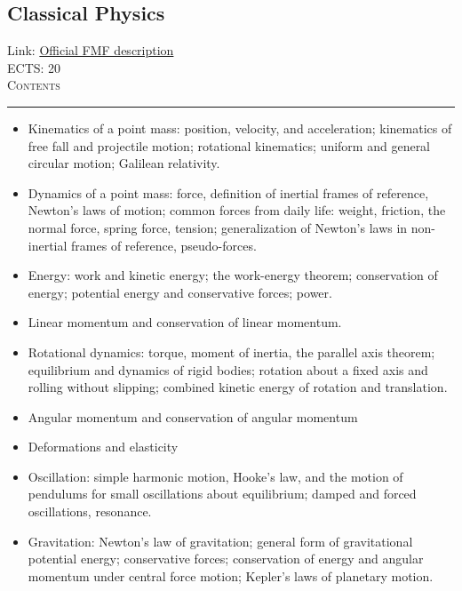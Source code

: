 \documentclass[11pt, a4paper]{article}
\newenvironment{course}[3]{
\subsection{#1}%
Link: \href{#2}{Official FMF description}\\%
ECTS: #3%
\vspace{1ex}
\\
{\large \textsc{Contents}}\\[-0.9ex]%
\rule{\textwidth}{0.5pt}
\vspace{-3ex}
}
{}
\newenvironment{chapter}[1]{
\begin{tcolorbox}[title=#1, breakable]
}
{\end{tcolorbox}}
\begin{document}
\begin{course}{Classical Physics}{https://www.fmf.uni-lj.si/en/study-physics/programmes/1fiz/2020/7000777/courses/1154/}{20}
    \label{classical_physics}

\begin{chapter}{Mechanics}

    \begin{itemize}
    
        \item Kinematics of a point mass: position, velocity, and acceleration; kinematics of free fall and projectile motion; rotational kinematics; uniform and general circular motion; Galilean relativity.

        \item Dynamics of a point mass: force, definition of inertial frames of reference, Newton's laws of motion; common forces from daily life: weight, friction, the normal force, spring force, tension; generalization of Newton's laws in non-inertial frames of reference, pseudo-forces.
     
        \item Energy: work and kinetic energy; the work-energy theorem; conservation of energy; potential energy and conservative forces; power.

        \item Linear momentum and conservation of linear momentum.

        \item Rotational dynamics: torque, moment of inertia, the parallel axis theorem; equilibrium and dynamics of rigid bodies; rotation about a fixed axis and rolling without slipping; combined kinetic energy of rotation and translation.

        \item Angular momentum and conservation of angular momentum

        \item Deformations and elasticity

        \item Oscillation: simple harmonic motion, Hooke's law, and the motion of pendulums for small oscillations about equilibrium; damped and forced oscillations, resonance.

        \item Gravitation: Newton's law of gravitation; general form of gravitational potential energy; conservative forces; conservation of energy and angular momentum under central force motion; Kepler's laws of planetary motion.


\end{itemize}
\end{chapter}
\end{course}
\end{document}
